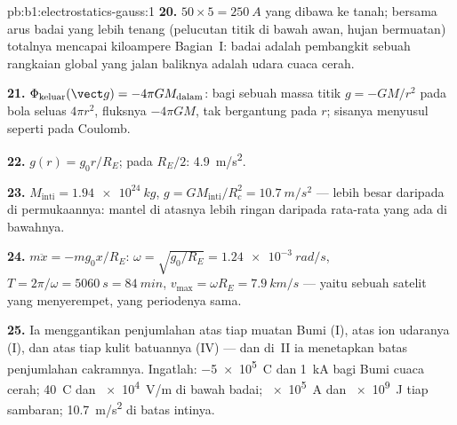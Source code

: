 \begin{solution}{pb:b1:electrostatics-gauss:1}
\textbf{20.} $50 \times 5 = \qty{250}{A}$ yang dibawa ke tanah; bersama
arus badai yang lebih tenang (pelucutan titik di bawah awan, hujan bermuatan)
totalnya mencapai kiloampere Bagian~I: badai adalah pembangkit sebuah
rangkaian global yang jalan baliknya adalah udara cuaca cerah.

\textbf{21.} $\Phi_{\text{keluar}}(\vect g) = -4\pi GM_{\text{dalam}}$: bagi sebuah massa titik
$g = -GM/r^2$ pada bola seluas $4\pi r^2$, fluksnya $-4\pi GM$, tak bergantung
pada $r$; sisanya menyusul seperti pada Coulomb.

\textbf{22.} $g(r) = g_0r/R_E$; pada $R_E/2$: \qty{4.9}{m/s^2}.

\textbf{23.} $M_{\text{inti}} = \qty{1.94e24}{kg}$, $g = GM_{\text{inti}}/R_c^2 =
\qty{10.7}{m/s^2}$ --- lebih besar daripada di permukaannya: mantel di atasnya lebih
ringan daripada rata-rata yang ada di bawahnya.

\textbf{24.} $m\ddot x = -mg_0x/R_E$: $\omega = \sqrt{g_0/R_E} = \qty{1.24e-3}{rad/s}$,
$T = 2\pi/\omega = \qty{5060}{s} = \qty{84}{min}$, $v_{\max} = \omega R_E =
\qty{7.9}{km/s}$ --- yaitu  sebuah satelit yang menyerempet, yang
periodenya sama.

\textbf{25.} Ia menggantikan penjumlahan atas tiap muatan Bumi (I),
atas ion udaranya (I), dan atas tiap kulit batuannya (IV) --- dan
di~II ia menetapkan batas penjumlahan cakramnya. Ingatlah: \qty{-5e5}{C} dan
\qty{1}{kA} bagi Bumi cuaca cerah; \qty{40}{C} dan \qty{e4}{V/m} di bawah
badai; \qty{e5}{A} dan \qty{e9}{J} tiap sambaran; \qty{10.7}{m/s^2} di batas
intinya.
\end{solution}
